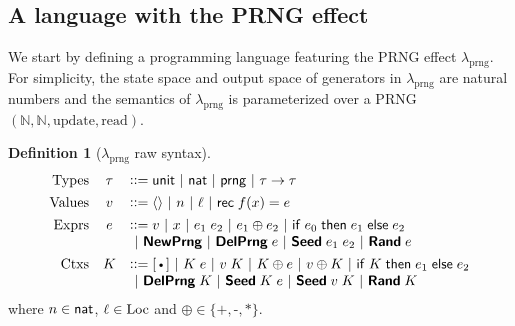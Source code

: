 \documentclass{article}
\theoremstyle{definition}
\newtheorem{definition}{Definition}[section]
\theoremstyle{plain}
\theoremstyle{remark}
\newcommand{\prng}{\mathrm{prng}}
\newcommand{\out}{\mathrm{read}}
\newcommand{\upd}{\mathrm{update}}
\newcommand{\recval}[3]{\syn{rec}\;#1(#2)=#3}
\begin{document}
\subsection{A language with the PRNG effect}

We start by defining a programming language featuring the PRNG effect \(\lambda_\prng\).
For simplicity, the state space and output space of generators in \(\lambda_\prng\) are natural numbers and the semantics of \(\lambda_\prng\) is parameterized over a PRNG \((\mathbb{N},\mathbb{N},\upd,\out)\).

\begin{definition}[\(\lambda_{\prng}\) raw syntax]
  \[
  \begin{array}{rcl}
    \text{Types} &\tau &\bnfdef \tunit \ALT \tnat \ALT \syn{prng} \ALT \tau \to \tau \\[4pt]
    \text{Values} &v   &\bnfdef \vunit \ALT n \ALT \ell \ALT \recval{f}{x}{e} \\[4pt]
    \text{Exprs}  &e   &\bnfdef v \ALT x \ALT e_1\;e_2 \ALT e_1 \oplus e_2 \ALT \syn{if}\;e_0\;\syn{then}\;e_1\;\syn{else}\;e_2 \\
                  &&\ALT \kw{NewPrng} \ALT \kw{DelPrng}\;e \ALT \kw{Seed}\;e_1\;e_2 \ALT \kw{Rand}\;e \\[4pt]
    \text{Ctxs} &K &\bnfdef \ctxhole \ALT K\;e \ALT v\;K \ALT K \oplus e \ALT v \oplus K \ALT \syn{if}\;K\;\syn{then}\;e_1\;\syn{else}\;e_2 \\
                &&\ALT \kw{DelPrng}\;K \ALT \kw{Seed}\;K\;e \ALT \kw{Seed}\;v\;K \ALT \kw{Rand}\;K
  \end{array}
  \]
  where \(n\in{ {\mathsf{nat}}}\), \(\ell\in\mathrm{Loc}\) and \(\oplus\in\{\texttt{+},\texttt{-},\texttt{*}\}\).
\end{definition}
\end{document}
